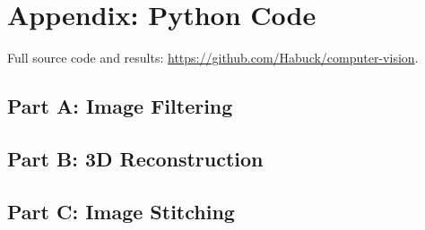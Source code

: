 \documentclass[a4paper,12pt]{article}
\begin{document}
\appendix
\section{Appendix: Python Code}
Full source code and results: \url{https://github.com/Habuck/computer-vision}.

\subsection{Part A: Image Filtering}


\subsection{Part B: 3D Reconstruction}


\subsection{Part C: Image Stitching}

\end{document}
